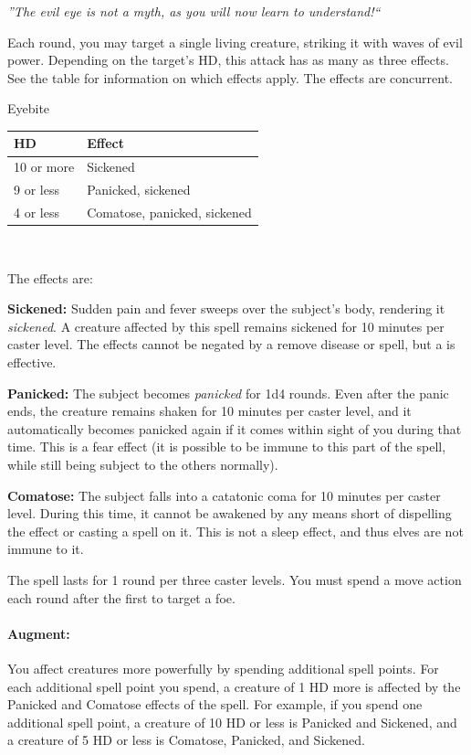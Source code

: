 \emph{''The evil eye is not a myth, as you will now learn to understand!``}

Each round, you may target a single living creature, striking it with waves of evil power.
Depending on the target's HD, this attack has as many as three effects. See the  table for information on which effects apply.
The effects are concurrent.

\begin{tableonecolumn}
\caption{Eyebite}
\label{tab:Eyebite}
\begin{tabular}{|l|l|}
\hline
HD&Effect\\
\hline
10 or more&Sickened\\
9 or less&Panicked, sickened\\
4 or less&Comatose, panicked, sickened\\
\hline
\end{tabular}\\
\end{tableonecolumn}
The effects are:

\textbf{Sickened:} Sudden pain and fever sweeps over the subject's body, rendering it \emph{sickened}.
A creature affected by this spell remains sickened for 10 minutes per caster level. 
The effects cannot be negated by a remove disease or  spell, but a  is effective.

\textbf{Panicked:} The subject becomes \emph{panicked} for 1d4 rounds. 
Even after the panic ends, the creature remains shaken for 10 minutes per caster level, and 
it automatically becomes panicked again if it comes within sight of you during that time. 
This is a fear effect (it is possible to be immune to this part of the spell, while still being subject to the others normally).

\textbf{Comatose:} The subject falls into a catatonic coma for 10 minutes per caster level. 
During this time, it cannot be awakened by any means short of dispelling the effect or casting a  spell on it. 
This is not a sleep effect, and thus elves are not immune to it.

The spell lasts for 1 round per three caster levels. You must spend a move action each round after the first to target a foe. 

\paragraph{Augment:} You affect creatures more powerfully by spending additional spell points.
For each additional spell point you spend, a creature of 1 HD more is affected by the Panicked and Comatose effects of the spell.
For example, if you spend one additional spell point, a creature of 10 HD or less is Panicked and Sickened, and a creature of 5 HD or less is Comatose, Panicked, and Sickened.
